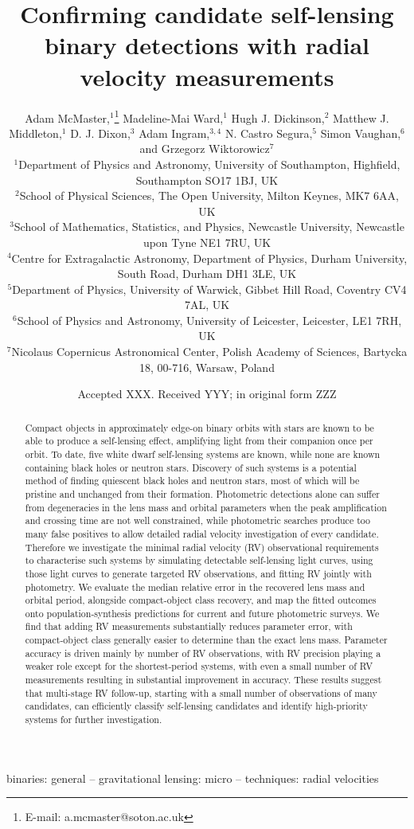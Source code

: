 \documentclass[fleqn,usenatbib]{mnras}
\title{Confirming candidate self-lensing binary detections with radial velocity measurements}
\author[Adam McMaster et al.]{
Adam McMaster,$^{1}$\thanks{E-mail: a.mcmaster@soton.ac.uk}
Madeline-Mai Ward,$^{1}$
Hugh J. Dickinson,$^{2}$
Matthew J. Middleton,$^{1}$
D. J. Dixon,$^{3}$
\newauthor \;
Adam Ingram,$^{3,4}$
N. Castro Segura,$^{5}$
Simon Vaughan,$^{6}$
and Grzegorz Wiktorowicz$^{7}$
\\
$^{1}$Department of Physics and Astronomy, University of Southampton, Highfield, Southampton SO17 1BJ, UK\\
$^{2}$School of Physical Sciences, The Open University, Milton Keynes, MK7 6AA, UK\\
$^{3}$School of Mathematics, Statistics, and Physics, Newcastle University, Newcastle upon Tyne NE1 7RU, UK\\
$^{4}$Centre for Extragalactic Astronomy, Department of Physics, Durham University, South Road, Durham DH1 3LE, UK\\
$^{5}$Department of Physics, University of Warwick, Gibbet Hill Road, Coventry CV4 7AL, UK\\
$^{6}$School of Physics and Astronomy, University of Leicester, Leicester, LE1 7RH, UK\\
$^{7}$Nicolaus Copernicus Astronomical Center, Polish Academy of Sciences, Bartycka 18, 00-716, Warsaw, Poland
}
\date{Accepted XXX. Received YYY; in original form ZZZ}
\begin{document}
\label{firstpage}
\pagerange{\pageref{firstpage}--\pageref{lastpage}}
\maketitle

\begin{abstract}
    Compact objects in approximately edge-on binary orbits with stars are known to be able to produce a self-lensing effect, amplifying light from their companion once per orbit. To date, five white dwarf self-lensing systems are known, while none are known containing black holes or neutron stars. Discovery of such systems is a potential method of finding quiescent black holes and neutron stars, most of which will be pristine and unchanged from their formation. Photometric detections alone can suffer from degeneracies in the lens mass and orbital parameters when the peak amplification and crossing time are not well constrained, while photometric searches produce too many false positives to allow detailed radial velocity investigation of every candidate. Therefore we investigate the minimal radial velocity (RV) observational requirements to characterise such systems by simulating detectable self-lensing light curves, using those light curves to generate targeted RV observations, and fitting RV jointly with photometry. We evaluate the median relative error in the recovered lens mass and orbital period, alongside compact-object class recovery, and map the fitted outcomes onto population-synthesis predictions for current and future photometric surveys. We find that adding RV measurements substantially reduces parameter error, with compact-object class generally easier to determine than the exact lens mass. Parameter accuracy is driven mainly by number of RV observations, with RV precision playing a weaker role except for the shortest-period systems, with even a small number of RV measurements resulting in substantial improvement in accuracy. These results suggest that multi-stage RV follow-up, starting with a small number of observations of many candidates, can efficiently classify self-lensing candidates and identify high-priority systems for further investigation.
\end{abstract}

\begin{keywords}
    binaries: general -- gravitational lensing: micro -- techniques: radial velocities
\end{keywords}
\end{document}
